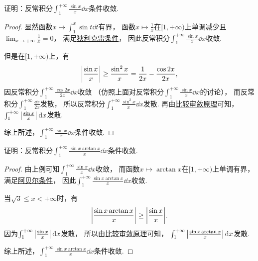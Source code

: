 \begin{example}
证明：反常积分\(\int_1^{+\infty} \frac{\sin x}{x} \dd{x}\)条件收敛.
\begin{proof}
显然函数\(x \mapsto \int_1^x \sin t \dd{t}\)有界，
函数\(x \mapsto \frac1x\)在\([1,+\infty)\)上单调减少且\(\lim_{x\to+\infty} \frac1x = 0\)，
满足\hyperref[theorem:反常积分.无穷限的反常积分的阿贝尔--狄利克雷审敛法]{狄利克雷条件}，
因此反常积分\(\int_1^{+\infty} \frac{\sin x}{x} \dd{x}\)收敛.

但是在\([1,+\infty)\)上，有\begin{equation*}
	\abs{\frac{\sin x}{x}}
	\geq \frac{\sin^2x}{x}
	= \frac1{2x} - \frac{\cos2x}{2x},
\end{equation*}
因反常积分\(\int_1^{+\infty} \frac{\cos2x}{2x} \dd{x}\)收敛
（仿照上面对反常积分\(\int_1^{+\infty} \frac{\sin x}{x} \dd{x}\)的讨论），
而反常积分\(\int_1^{+\infty} \frac{\dd{x}}{2x}\)发散，
所以反常积分\(\int_1^{+\infty} \frac{\sin^2x}{x} \dd{x}\)发散.
再由\hyperref[theorem:定积分.无穷限反常积分的比较审敛原理]{比较审敛原理}可知，
\(\int_1^{+\infty} \abs{\frac{\sin x}{x}} \dd{x}\)发散.

综上所述，\(\int_1^{+\infty} \frac{\sin x}{x} \dd{x}\)条件收敛.
\end{proof}
\end{example}
\begin{example}
证明：反常积分\(\int_1^{+\infty} \frac{\sin x \arctan x}{x} \dd{x}\)条件收敛.
\begin{proof}
由上例可知\(\int_1^{+\infty} \frac{\sin x}{x} \dd{x}\)收敛，
而函数\(x \mapsto \arctan x\)在\([1,+\infty)\)上单调有界，
满足\hyperref[theorem:反常积分.无穷限的反常积分的阿贝尔--狄利克雷审敛法]{阿贝尔条件}，
因此\(\int_1^{+\infty} \frac{\sin x \arctan x}{x} \dd{x}\)收敛.

当\(\sqrt3 \leq x < +\infty\)时，有\begin{equation*}
	\abs{\frac{\sin x \arctan x}{x}}
	\geq \abs{\frac{\sin x}{x}}.
\end{equation*}
因为\(\int_1^{+\infty} \abs{\frac{\sin x}{x}} \dd{x}\)发散，
所以由\hyperref[theorem:定积分.无穷限反常积分的比较审敛原理]{比较审敛原理}可知，
\(\int_1^{+\infty} \abs{\frac{\sin x \arctan x}{x}} \dd{x}\)发散.

综上所述，\(\int_1^{+\infty} \frac{\sin x \arctan x}{x} \dd{x}\)条件收敛.
\end{proof}
\end{example}

